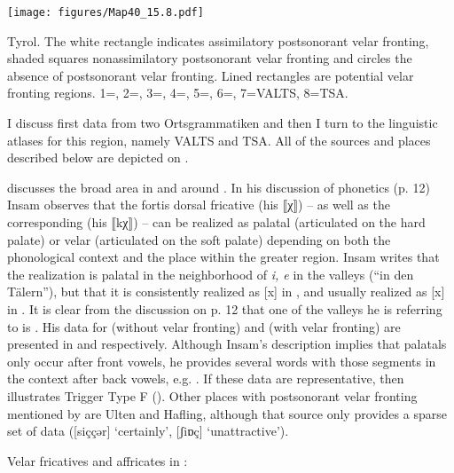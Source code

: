 \begin{map}
\texttt{[image: figures/Map40\_15.8.pdf]}
\caption[{Tyrol}]{{Tyrol}. The white rectangle indicates assimilatory postsonorant velar fronting, shaded squares nonassimilatory postsonorant velar fronting and circles the absence of postsonorant velar fronting. Lined rectangles are potential velar fronting regions. 1=\citet{Schatz1897}, 2=\citet{Egger1909}, 3=\citet{Insam1936}, 4=\citet{Hathaway1979}, 5=\citet{Moosmüller1991}, 6=\citet{Kollmann2007}, 7=VALTS, 8=TSA.}\label{map:40}
\end{map}

I discuss first data from two Ortsgrammatiken and then I turn to the linguistic atlases for this region, namely VALTS and TSA. All of the sources and places described below are depicted on .\largerpage[2]

\citet{Insam1936} discusses the broad area in and around . In his discussion of phonetics (p. 12) Insam observes that the fortis dorsal fricative (his ⟦χ⟧) -- as well as the corresponding  (his ⟦kχ⟧) -- can be realized as palatal (articulated on the hard palate) or velar (articulated on the soft palate) depending on both the phonological context and the place within the greater  region. Insam writes that the realization is palatal in the neighborhood of \textit{i, e}  in the valleys (“in den Tälern”), but that it is consistently realized as [x] in , and usually realized as [x] in . It is clear from the discussion on p. 12 that one of the valleys he is referring to is . His data for  (without velar fronting) and  (with velar fronting) are presented in  and  respectively. Although Insam’s description implies that palatals only occur after front vowels, he provides several words with those segments in the context after back vowels, e.g. . If these data are representative, then  illustrates Trigger Type F (). Other places with postsonorant velar fronting mentioned by \citet[49]{Insam1936} are Ulten and Hafling, although that source only provides a sparse set of data ([siççər] ‘certainly’, [ʃiɒç] ‘unattractive’).\largerpage[2]



\ea%
\label{ex:15:41}Velar fricatives and affricates in :

